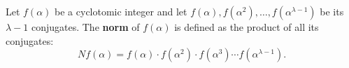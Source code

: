 Let $f(\alpha)$ be a cyclotomic integer and let $f(\alpha), f(\alpha^2), \ldots, f(\alpha^{\lambda-1})$ be its $\lambda-1$ conjugates. The \textbf{norm} of $f(\alpha)$ is defined as the product of all its conjugates:
$$Nf(\alpha) = f(\alpha) \cdot f(\alpha^2) \cdot f(\alpha^3) \cdots f(\alpha^{\lambda-1}).$$
